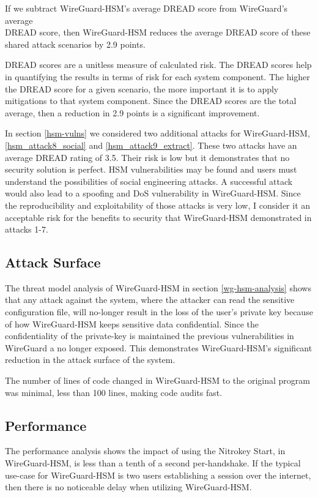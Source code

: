 \documentclass [11pt, proquest] {uwthesis}[2020/02/24]
\begin{document}
If we subtract WireGuard-HSM’s average DREAD score from WireGuard’s average\\
DREAD score, then WireGuard-HSM reduces the average DREAD score of these shared attack scenarios by 2.9 points.

DREAD scores are a unitless measure of calculated risk. The DREAD scores help in quantifying the results in terms of risk for each system component. The higher the DREAD score for a given scenario, the more important it is to apply mitigations to that system component. Since the DREAD scores are the total average, then a reduction in 2.9 points is a significant improvement.

In section \ref{hsm-vulns} we considered two additional attacks for WireGuard-HSM, \ref{hsm_attack8_social} and \ref{hsm_attack9_extract}. 
These two attacks have an average DREAD rating of 3.5. Their risk is low but it demonstrates that no security solution is perfect. HSM vulnerabilities may be found and users must understand the possibilities of social engineering attacks.
A successful attack would also lead to a spoofing and DoS vulnerability in WireGuard-HSM. Since the reproducibility and exploitability of those attacks is very low, I consider it an acceptable risk for the benefits to security that WireGuard-HSM demonstrated in attacks 1-7.


\subsection{Attack Surface}
\label{attacksurface}
The threat model analysis of WireGuard-HSM in section \ref{wg-hsm-analysis} shows that any attack against the system, where the attacker can read the sensitive configuration file, will no-longer result in the loss of the user's private key because of how WireGuard-HSM keeps sensitive data confidential. Since the confidentiality of the private-key is maintained the previous vulnerabilities in WireGuard a no longer exposed. This demonstrates WireGuard-HSM's significant reduction in the attack surface of the system.

The number of lines of code changed in WireGuard-HSM to the original program was minimal, less than 100 lines, making code audits fast.

\subsection{Performance}
The performance analysis shows the impact of using the Nitrokey Start, in WireGuard-HSM, is less than a tenth of a second per-handshake. If the typical use-case for WireGuard-HSM is two users establishing a session over the internet, then there is no noticeable delay when utilizing WireGuard-HSM.
\end{document}
